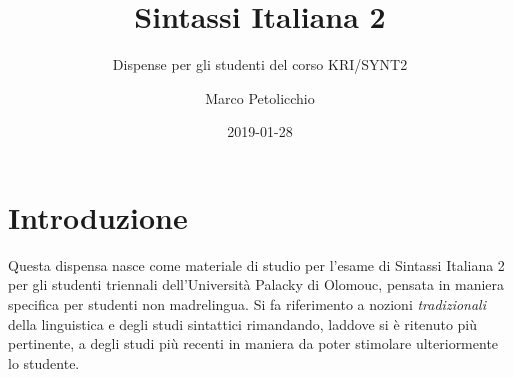 \documentclass[a4paper,twoside,11pt,chapterprefix=false,bibliography=totocnumbered,listof=flat]{scrbook}
\title{Sintassi Italiana 2}
\subtitle{Dispense per gli studenti del corso KRI/SYNT2}
\author{Marco Petolicchio}
\date{2019-01-28}
\makeatletter
\newcommand\HUGE{\@setfontsize\Huge{36}{48}}
\makeatother
\begin{document}
\maketitle

\makeatletter
{}
\makeatother
\nopagecolor%
\pagecolor{white}

{
\setcounter{tocdepth}{1}
\tableofcontents
}
\listoftables
\listoffigures
\hypertarget{introduzione}{%
\chapter*{Introduzione}\label{introduzione}}

Questa dispensa nasce come materiale di studio per l'esame di Sintassi
Italiana 2 per gli studenti triennali dell'Università Palacky di
Olomouc, pensata in maniera specifica per studenti non madrelingua. Si
fa riferimento a nozioni \emph{tradizionali} della linguistica e degli
studi sintattici rimandando, laddove si è ritenuto più pertinente, a
degli studi più recenti in maniera da poter stimolare ulteriormente lo
studente.
\end{document}
